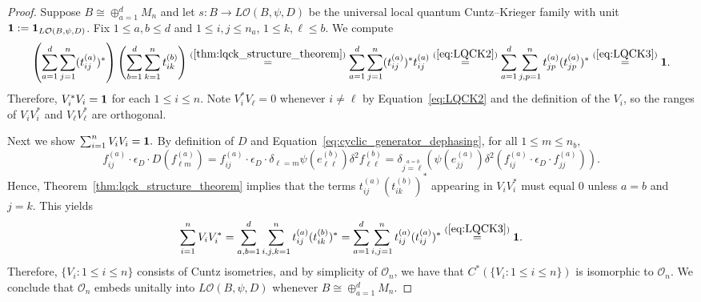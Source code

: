 \documentclass[11pt]{article}
\theoremstyle{plain}
\theoremstyle{nonumberplain}
\theoremstyle{plain}
\newtheorem{remark}[lemma]{Remark}
\theoremstyle{nonumberplain}
\newtheorem{proof}{Proof.}
\newcommand\1{{\bf 1}}
\newcommand\cO{{\mathcal O}}
\newcommand{\tr}{\text{tr}} %
\newcommand{\<}{\left\langle}
\renewcommand{\>}{\right\rangle}
\begin{document}
\begin{proof}
    Suppose $B\cong \oplus_{a=1}^d M_n$ and let $s:B\to L\cO(B,\psi,D)$ be the universal local quantum Cuntz--Krieger family with unit ${\bf 1}:={\bf 1}_{L\cO(B,\psi,D)}$. Fix $1\leq a,b\leq d$ and $1\leq i,j\leq n_a$, $1\leq k,\ell\leq b$. We compute
    \[
        \left(\sum_{a=1}^d\sum_{j=1}^n (t^{(a)}_{ij})^*\right)\left(\sum_{b=1}^d \sum_{k=1}^n t^{(b)}_{ik} \right)
        \overset{(\ref{thm:lqck_structure_theorem})}{=}
        \sum_{a=1}^d \sum_{j=1}^n (t^{(a)}_{ij})^*t^{(a)}_{ij}  
        \overset{(\ref{eq:LQCK2})}{=}
        \sum_{a=1}^d \sum_{j,p=1}^n t^{(a)}_{jp}(t^{(a)}_{jp})^* 
        \overset{(\ref{eq:LQCK3})}{=}
        {\bf 1}.
    \]
   Therefore, $V_i^*V_i = {\bf 1}$ for each $1\leq i\leq n$. Note $V_i^*V_\ell = 0$ whenever $i\neq \ell$ by Equation~\ref{eq:LQCK2} and the definition of the $V_i$, so the ranges of $V_iV_i^*$ and $V_\ell V_\ell^*$ are orthogonal. 
   
   Next we show $\sum_{i=1}^n V_iV_i={\bf 1}.$ By definition of $D$ and Equation~\ref{eq:cyclic_generator_dephasing}, for all $1\leq m\leq n_b,$
   \[
   f_{ij}^{(a)}\cdot \epsilon_D \cdot D(f_{\ell m}^{(a)})
   =
   f_{ij}^{(a)}\cdot \epsilon_D \cdot \delta_{\ell = m} \psi(e_{\ell \ell}^{(b)}) \delta^2 f_{\ell \ell}^{(b)}
   =
   \delta_{\stackrel{a=b}{j=\ell} }(\psi(e_{jj}^{(a)}) \delta ^2(f_{ij}^{(a)}\cdot \epsilon_D \cdot f_{jj}^{(a)})).
   \]
   Hence, Theorem~\ref{thm:lqck_structure_theorem} implies that the terms $t_{ij}^{(a)}(t_{ik}^{(b)})^*$ appearing in $V_iV_i^*$ must equal $0$ unless $a=b$ and $j=k$. This yields
    \[
        \sum\limits_{i=1}^n
        V_iV_i^*
        =
        \sum\limits_{a,b=1}^d\sum\limits_{i,j,k=1}^n t^{(a)}_{ij}  (t^{(b)}_{ik})^* 
        =
        \sum\limits_{a=1}^d\sum\limits_{i,j=1}^n t^{(a)}_{ij}  (t^{(a)}_{ij})^* 
        \overset{(\ref{eq:LQCK3})}{=}{\bf 1}.
    \]
Therefore, $\{V_i:1\leq i\leq n\}$ consists of Cuntz isometries, and by simplicity of $\cO_n$, we have that $C^*(\{V_i:1\leq i\leq n\})$ is isomorphic to $\cO_n$. We conclude that $\cO_n$ embeds unitally into $L\cO(B,\psi,D)$ whenever $B\cong \oplus_{a=1}^d M_n.$ 
\end{proof}

\end{document}
